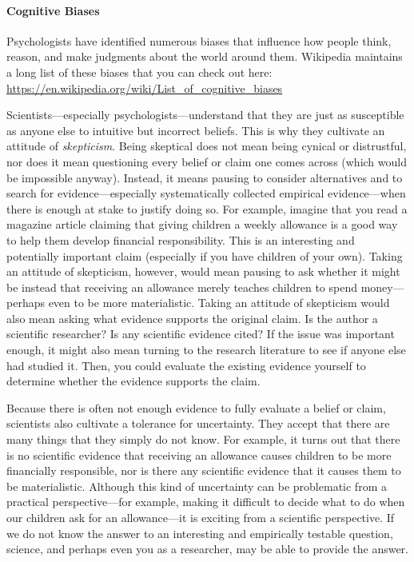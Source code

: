\paragraph{Cognitive Biases}
Psychologists have identified numerous biases that influence how people think, reason, and make judgments about the world around them. Wikipedia maintains a long list of these biases that you can check out here: \url{https://en.wikipedia.org/wiki/List_of_cognitive_biases}


Scientists---especially psychologists---understand that they are just as susceptible as anyone else to intuitive but incorrect beliefs. This is why they cultivate an attitude of \emph{skepticism}. Being skeptical does not mean being cynical or distrustful, nor does it mean questioning every belief or claim one comes across (which would be impossible anyway). Instead, it means pausing to consider alternatives and to search for evidence---especially systematically collected empirical evidence---when there is enough at stake to justify doing so. For example, imagine that you read a magazine article claiming that giving children a weekly allowance is a good way to help them develop financial responsibility. This is an interesting and potentially important claim (especially if you have children of your own). Taking an attitude of skepticism, however, would mean pausing to ask whether it might be instead that receiving an allowance merely teaches children to spend money---perhaps even to be more materialistic. Taking an attitude of skepticism would also mean asking what evidence supports the original claim. Is the author a scientific researcher? Is any scientific evidence cited? If the issue was important enough, it might also mean turning to the research literature to see if anyone else had studied it. Then, you could evaluate the existing evidence yourself to determine whether the evidence supports the claim.

Because there is often not enough evidence to fully evaluate a belief or claim, scientists also cultivate a tolerance for uncertainty. They accept that there are many things that they simply do not know. For example, it turns out that there is no scientific evidence that receiving an allowance causes children to be more financially responsible, nor is there any scientific evidence that it causes them to be materialistic. Although this kind of uncertainty can be problematic from a practical perspective---for example, making it difficult to decide what to do when our children ask for an allowance---it is exciting from a scientific perspective. If we do not know the answer to an interesting and empirically testable question, science, and perhaps even you as a researcher, may be able to provide the answer.

